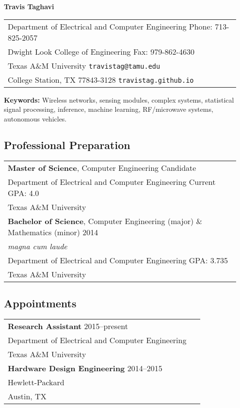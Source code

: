\newpage

\begin{center}
{\bfseries \Large Travis Taghavi}
\end{center}

\begin{center}
\begin{tabular}{p{0.95\linewidth}}
Department of Electrical and Computer Engineering
\hfill Phone: 713-825-2057 \\
Dwight Look College of Engineering
\hfill Fax: 979-862-4630 \\
Texas A\&M University
\hfill \texttt{travistag@tamu.edu} \\
College Station, TX 77843-3128
\hfill \texttt{travistag.github.io}
\end{tabular}
\end{center}

\textbf{Keywords:} Wireless networks, sensing modules, complex systems, statistical signal processing, inference, machine learning, RF/microwave systems, autonomous vehicles.

\subsection*{Professional Preparation}

\begin{center}
\begin{tabular}{p{0.95\linewidth}}
\textbf{Master of Science}, Computer Engineering \hfill Candidate \\
Department of Electrical and Computer Engineering \hfill Current GPA: 4.0 \\
Texas A\&M University \\[2mm]
\textbf{Bachelor of Science}, Computer Engineering (major) \& Mathematics (minor) \hfill 2014 \\
{\em magna cum laude}\\
Department of Electrical and Computer Engineering \hfill GPA: 3.735\\
Texas A\&M University
\end{tabular}
\end{center}

\subsection*{Appointments}

\begin{center}
\begin{tabular}{p{0.95\linewidth}}
\textbf{Research Assistant} \hfill 2015--present \\
Department of Electrical and Computer Engineering \\
Texas A\&M University \\[4pt]
\textbf{Hardware Design Engineering} \hfill 2014--2015 \\
Hewlett-Packard \\
Austin, TX
\end{tabular}
\end{center}

